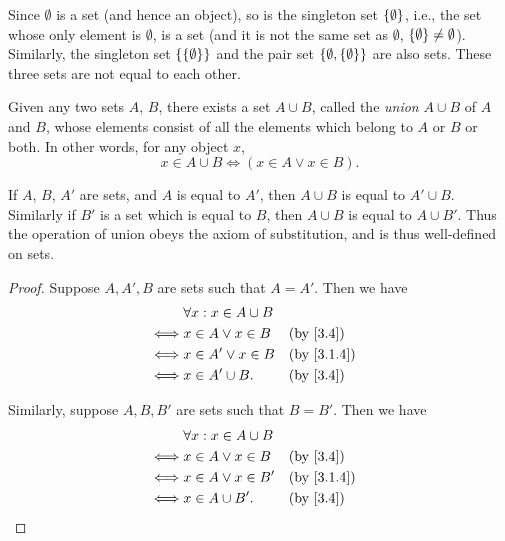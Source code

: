 \begin{eg}\label{3.1.10}
  Since \(\emptyset\) is a set (and hence an object), so is the singleton set \(\left\lbrace\emptyset\right\rbrace\), i.e., the set whose only element is \(\emptyset\), is a set (and it is not the same set as \(\emptyset\), \(\left\lbrace\emptyset\right\rbrace \neq \emptyset\)).
  Similarly, the singleton set \(\left\lbrace\left\lbrace\emptyset\right\rbrace\right\rbrace\) and the pair set \(\left\lbrace\emptyset, \left\lbrace\emptyset\right\rbrace\right\rbrace\) are also sets.
  These three sets are not equal to each other.
\end{eg}

\begin{ax}\label{3.4}
  Given any two sets \(A\), \(B\), there exists a set \(A \cup B\), called the \emph{union} \(A \cup B\) of \(A\) and \(B\), whose elements consist of all the elements which belong to \(A\) or \(B\) or both.
  In other words, for any object \(x\),
  \[
    x \in A \cup B \iff (x \in A \lor x \in B).
  \]
\end{ax}

\setcounter{thm}{11}
\begin{rmk}\label{3.1.12}
  If \(A\), \(B\), \(A'\) are sets, and \(A\) is equal to \(A'\), then \(A \cup B\) is equal to \(A' \cup B\).
  Similarly if \(B'\) is a set which is equal to \(B\), then \(A \cup B\) is equal to \(A \cup B'\).
  Thus the operation of union obeys the axiom of substitution, and is thus well-defined on sets.
\end{rmk}

\begin{proof}
  Suppose \(A, A', B\) are sets such that \(A = A'\).
  Then we have
  \begin{align*}
         & \forall x : x \in A \cup B                             \\
    \iff & x \in A \lor x \in B       &  & \text{(by \cref{3.4})} \\
    \iff & x \in A' \lor x \in B      &  & \by{3.1.4}             \\
    \iff & x \in A' \cup B.           &  & \text{(by \cref{3.4})}
  \end{align*}

  Similarly, suppose \(A, B, B'\) are sets such that \(B = B'\).
  Then we have
  \begin{align*}
         & \forall x : x \in A \cup B                             \\
    \iff & x \in A \lor x \in B       &  & \text{(by \cref{3.4})} \\
    \iff & x \in A \lor x \in B'      &  & \by{3.1.4}             \\
    \iff & x \in A \cup B'.           &  & \text{(by \cref{3.4})}
  \end{align*}
\end{proof}

